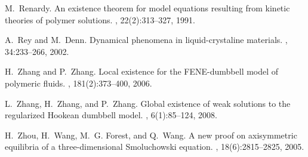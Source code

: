 \documentclass[reqno]{amsart}
\numberwithin{equation}{section}
\theoremstyle{definition}
\theoremstyle{remark}
\begin{document}
\begin{thebibliography}{99}
M.~Renardy.
\newblock An existence theorem for model equations resulting from kinetic
  theories of polymer solutions.
, 22(2):313--327, 1991.

A.~Rey and M.~Denn.
\newblock Dynamical phenomena in liquid-crystaline materials.
, 34:233--266, 2002.

H.~Zhang and P.~Zhang.
\newblock Local existence for the {FENE}-dumbbell model of polymeric fluids.
, 181(2):373--400, 2006.

L.~Zhang, H.~Zhang, and P.~Zhang.
\newblock Global existence of weak solutions to the regularized {H}ookean
  dumbbell model.
, 6(1):85--124, 2008.

H.~Zhou, H.~Wang, M.~G. Forest, and Q.~Wang.
\newblock A new proof on axisymmetric equilibria of a three-dimensional
  {S}moluchowski equation.
, 18(6):2815--2825, 2005.

\end{thebibliography}
\end{document}
